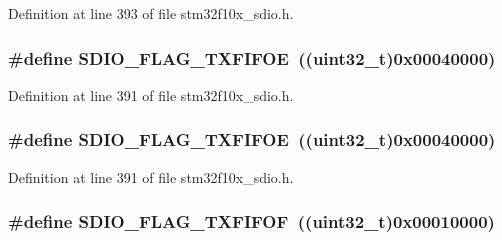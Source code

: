 Definition at line 393 of file stm32f10x\+\_\+sdio.\+h.

\subsubsection[{\texorpdfstring{S\+D\+I\+O\+\_\+\+F\+L\+A\+G\+\_\+\+T\+X\+F\+I\+F\+OE}{SDIO_FLAG_TXFIFOE}}]{\setlength{\rightskip}{0pt plus 5cm}\#define S\+D\+I\+O\+\_\+\+F\+L\+A\+G\+\_\+\+T\+X\+F\+I\+F\+OE~(({\bf uint32\+\_\+t})0x00040000)}\hypertarget{group___s_d_i_o___flags_gac41ef05773abad79b4b0c443a77733db}{}\label{group___s_d_i_o___flags_gac41ef05773abad79b4b0c443a77733db}


Definition at line 391 of file stm32f10x\+\_\+sdio.\+h.

\subsubsection[{\texorpdfstring{S\+D\+I\+O\+\_\+\+F\+L\+A\+G\+\_\+\+T\+X\+F\+I\+F\+OE}{SDIO_FLAG_TXFIFOE}}]{\setlength{\rightskip}{0pt plus 5cm}\#define S\+D\+I\+O\+\_\+\+F\+L\+A\+G\+\_\+\+T\+X\+F\+I\+F\+OE~(({\bf uint32\+\_\+t})0x00040000)}\hypertarget{group___s_d_i_o___flags_gac41ef05773abad79b4b0c443a77733db}{}\label{group___s_d_i_o___flags_gac41ef05773abad79b4b0c443a77733db}


Definition at line 391 of file stm32f10x\+\_\+sdio.\+h.

\subsubsection[{\texorpdfstring{S\+D\+I\+O\+\_\+\+F\+L\+A\+G\+\_\+\+T\+X\+F\+I\+F\+OF}{SDIO_FLAG_TXFIFOF}}]{\setlength{\rightskip}{0pt plus 5cm}\#define S\+D\+I\+O\+\_\+\+F\+L\+A\+G\+\_\+\+T\+X\+F\+I\+F\+OF~(({\bf uint32\+\_\+t})0x00010000)}\hypertarget{group___s_d_i_o___flags_gad3ca936300ef251639a4cfbe2f63b6b8}{}\label{group___s_d_i_o___flags_gad3ca936300ef251639a4cfbe2f63b6b8}


